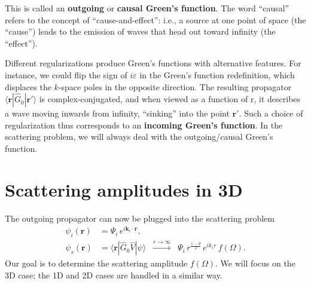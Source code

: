 \documentclass[pra,12pt]{revtex4}
\begin{document}
This is called an \textbf{outgoing} or \textbf{causal Green's
  function}.  The word ``causal'' refers to the concept of
``cause-and-effect'': i.e., a source at one point of space (the
``cause'') leads to the emission of waves that head out toward
infinity (the ``effect'').

Different regularizations produce Green's functions with alternative
features.  For instance, we could flip the sign of $i\varepsilon$ in
the Green's function redefinition, which displaces the $k$-space poles
in the opposite direction.  The resulting propagator
$\langle\mathbf{r}|\hat{G}_0|\mathbf{r}'\rangle$ is
complex-conjugated, and when viewed as a function of $\mathrm{r}$, it
describes a wave moving inwards from infinity, ``sinking'' into the
point $\mathbf{r}'$.  Such a choice of regularization thus corresponds
to an \textbf{incoming Green's function}.  In the scattering problem,
we will always deal with the outgoing/causal Green's function.

\section{Scattering amplitudes in 3D}
\label{sec:3damp}

The outgoing propagator can now be plugged into the scattering problem
$$\begin{aligned} \psi_i(\mathbf{r}) &= \Psi_i \, e^{i\mathbf{k}_i\cdot\mathbf{r}}, \\ \psi_s(\mathbf{r}) &= \langle\mathbf{r}| \hat{G}_0 \hat{V} |\psi\rangle \;\; \overset{r\rightarrow\infty}{\longrightarrow}\;\; \Psi_i \, r^{\frac{1-d}{2}} \, e^{ik_ir} \, f(\Omega).
\end{aligned}$$
Our goal is to determine the scattering amplitude $f(\Omega)$.  We
will focus on the 3D case; the 1D and 2D cases are handled in a
similar way.
\end{document}
